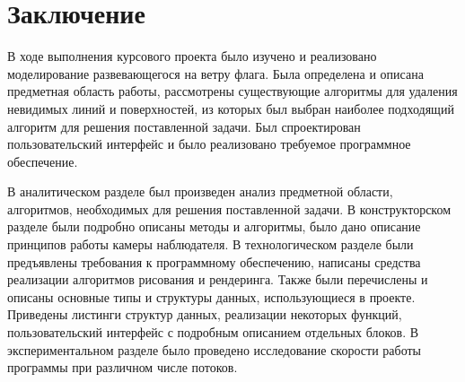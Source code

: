 \chapter*{Заключение}
\vspace{-0.5cm}\hspace{0.6cm}В ходе выполнения курсового проекта было изучено и реализовано моделирование развевающегося на ветру флага. Была определена и описана предметная область работы, рассмотрены существующие алгоритмы для удаления невидимых линий и поверхностей, из которых был выбран наиболее подходящий алгоритм для решения поставленной задачи. Был спроектирован пользовательский интерфейс и было реализовано требуемое программное обеспечение.

\vspace{0.3cm}В аналитическом разделе был произведен анализ предметной области, алгоритмов, необходимых для решения поставленной задачи. В конструкторском разделе были подробно описаны методы и алгоритмы, было дано описание принципов работы камеры наблюдателя. В технологическом разделе были предъявлены требования к программному обеспечению, написаны средства реализации алгоритмов рисования и рендеринга. Также были перечислены и описаны основные типы и структуры данных, использующиеся в проекте. Приведены листинги структур данных, реализации некоторых функций, пользовательский интерфейс с подробным описанием отдельных блоков. В экспериментальном разделе было проведено исследование скорости работы программы при различном числе потоков.

\newpage

